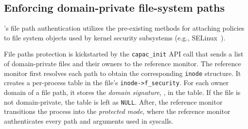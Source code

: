 



\subsection{Enforcing domain-private file-system paths}
\label{sec:design:path}
\thename's file path authentication utilizes the pre-existing methods for attaching policies to file system objects used by kernel security subsystems (e.g., SELinux~\cite{selinux}).

File paths protection is kickstarted by the \texttt{capac\_init} API call that sends a list of domain-private files and their owners to the reference monitor.
The reference monitor first resolves each path to obtain the corresponding \texttt{inode} structure.
It creates a per-process table in the file's \texttt{inode->f\_security}.
For each owner domain of a file path, it stores the \emph{domain signature}, , in the table.
If the file is not domain-private, the table is left as \texttt{NULL}.
After, the reference monitor transitions the process into the \emph{protected mode}, where the reference monitor authenticates every path and \fd arguments used in syscalls.



